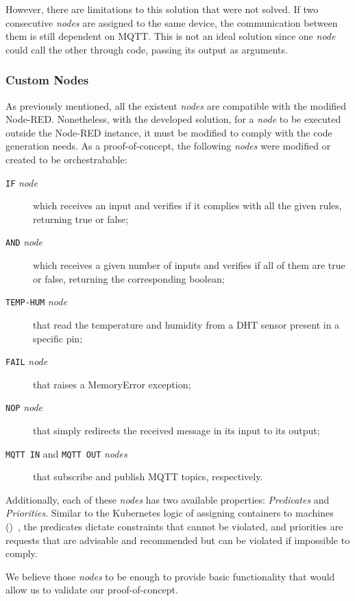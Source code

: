 However, there are limitations to this solution that were not solved. If two consecutive \textit{nodes} are assigned to the same device, the communication between them is still dependent on MQTT. This is not an ideal solution since one \textit{node} could call the other through code, passing its output as arguments.

\subsubsection{Custom Nodes}\label{sec:custom_nodes}

As previously mentioned, all the existent \textit{nodes} are compatible with the modified Node-RED. Nonetheless, with the developed solution, for a \textit{node} to be executed outside the Node-RED instance, it must be modified to comply with the code generation needs. As a proof-of-concept, the following \textit{nodes} were modified or created to be orchestrabable:
\begin{description}
    \item[\texttt{IF} \textit{node}] which receives an input and verifies if it complies with all the given rules, returning true or false;
    \item[\texttt{AND} \textit{node}] which receives a given number of inputs and verifies if all of them are true or false, returning the corresponding boolean;
    \item[\texttt{TEMP-HUM} \textit{node}] that read the temperature and humidity from a DHT sensor present in a specific pin;
    \item[\texttt{FAIL} \textit{node}] that raises a MemoryError exception;
    \item[\texttt{NOP} \textit{node}] that simply redirects the received message in its input to its output;
    \item[\texttt{MQTT IN} and \texttt{MQTT OUT} \textit{nodes}] that subscribe and publish MQTT topics, respectively.
\end{description}

Additionally, each of these \textit{nodes} has two available properties: \textit{Predicates} and \textit{Priorities}. Similar to the Kubernetes logic of assigning containers to machines (\cf {})~\cite{burns2018managing}, the predicates dictate constraints that cannot be violated, and priorities are requests that are advisable and recommended but can be violated if impossible to comply. 

We believe those \textit{nodes} to be enough to provide basic functionality that would allow us to validate our proof-of-concept.

